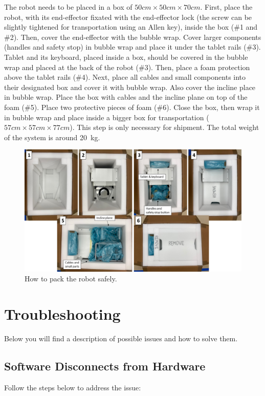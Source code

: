 \documentclass[10pt,oneside,a4paper]{article}
\begin{document}
The robot needs to be placed in a box of $50cm \times 50cm \times 70cm$. First, place the robot, with its end-effector fixated with the end-effector lock (the screw can be slightly tightened for transportation using an Allen key), inside the box (\#1 and \#2). Then, cover the end-effector with the bubble wrap. Cover larger components (handles and safety stop) in bubble wrap and place it under the tablet rails (\#3). Tablet and its keyboard, placed inside a box, should be covered in the bubble wrap and placed at the back of the robot (\#3). Then, place a foam protection above the tablet rails (\#4). Next, place all cables and small components into their designated box and cover it with bubble wrap. Also cover the incline place in bubble wrap. Place the box with cables and the incline plane on top of the foam (\#5). Place two protective pieces of foam (\#6). Close the box, then wrap it in bubble wrap and place inside a bigger box for transportation ($57cm \times 57cm \times 77cm$). This step is only necessary for shipment. The total weight of the system is around \SI{20}{\kg}.

\begin{figure}[h!]
\begin{center}
\includegraphics[width=\columnwidth]{images/Box/Packaging.png}
\caption{How to pack the robot safely.}
\label{fig:Packaging}
\end{center}
\end{figure}
\newpage
\section{Troubleshooting}
Below you will find a description of possible issues and how to solve them. 

\subsection{Software Disconnects from Hardware}
Follow the steps below to address the issue: 
\end{document}
